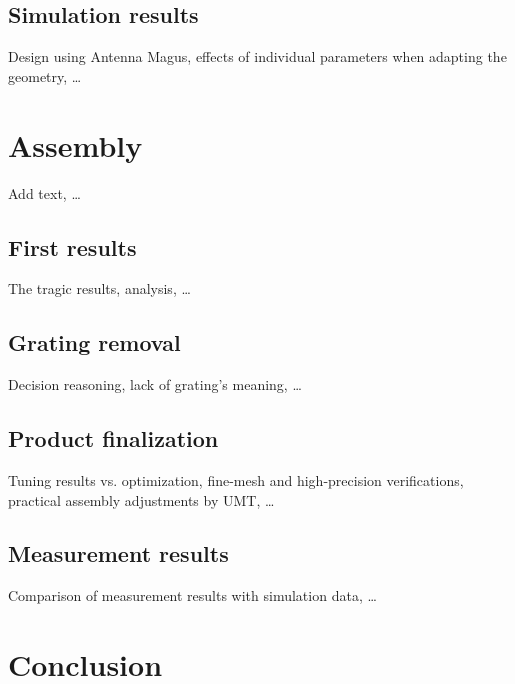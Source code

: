 \documentclass[11pt,a4paper,twoside,openany]{report}
\begin{document}
\section{Simulation results}
Design using Antenna Magus, effects of individual parameters when adapting the geometry, \dots

\newpage
\chapter{Assembly}
\label{chapter:assembly}
Add text, \dots

\section{First results}
The tragic results, analysis, \dots

\section{Grating removal}
Decision reasoning, lack of grating's meaning, \dots

\section{Product finalization}
Tuning results vs. optimization, fine-mesh and high-precision verifications, practical assembly adjustments by UMT, \dots

\section{Measurement results}
Comparison of measurement results with simulation data, \dots

\chapter*{Conclusion}
\label{chap:conclusion}

\lipsum[10-13]

\printnomenclature

\printbibliography[heading=bibintoc]

\printindex
\end{document}
